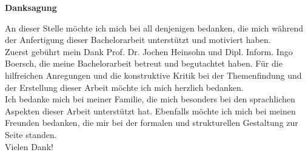 \thispagestyle{empty}

\begin{center}
    \Huge
    \textbf{Danksagung}
\end{center}

\vspace*{20mm}
\large
An dieser Stelle möchte ich mich bei all denjenigen bedanken, die mich während der Anfertigung dieser Bachelorarbeit unterstützt und motiviert haben.\\


Zuerst gebührt mein Dank Prof. Dr. Jochen Heinsohn und Dipl. Inform. Ingo Boersch, die meine Bachelorarbeit betreut und begutachtet haben.
Für die hilfreichen Anregungen und die konstruktive Kritik bei der Themenfindung und der Erstellung dieser Arbeit möchte ich mich herzlich bedanken.\\


Ich bedanke mich bei meiner Familie, die mich besonders bei den sprachlichen Aspekten dieser Arbeit unterstützt hat.
Ebenfalls möchte ich mich bei meinen Freunden bedanken, die mir bei der formalen und strukturellen Gestaltung zur Seite standen.\\


Vielen Dank!

\normalsize